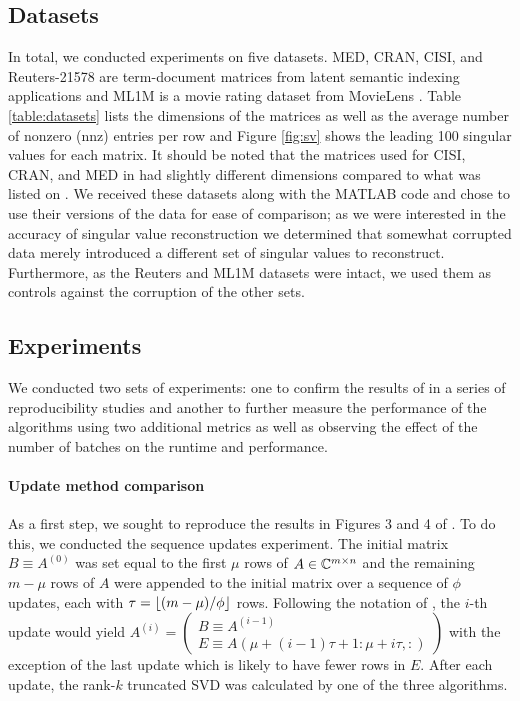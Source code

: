 \subsection{Datasets}

In total, we conducted experiments on five datasets. MED, CRAN, CISI, and Reuters-21578 are term-document matrices from latent semantic indexing applications \cite{LSISite,Cai2005,Cai2007,Cai2008,Cai2009} and ML1M is a movie rating dataset from MovieLens \cite{Harper2015}.
Table \ref{table:datasets} lists the dimensions of the matrices as well as the average number of nonzero (nnz) entries per row and Figure \ref{fig:sv} shows the leading 100 singular values for each matrix.
It should be noted that the matrices used for CISI, CRAN, and MED in \cite{Kalantzis2021} had slightly different dimensions compared to what was listed on \cite{LSISite}.
We received these datasets along with the MATLAB code and chose to use their versions of the data for ease of comparison; as we were interested in the accuracy of singular value reconstruction we determined that somewhat corrupted data merely introduced a different set of singular values to reconstruct.
Furthermore, as the Reuters and ML1M datasets were intact, we used them as controls against the corruption of the other sets.



\subsection{Experiments}

We conducted two sets of experiments: one to confirm the results of \cite{Kalantzis2021} in a series of reproducibility studies and another to further measure the performance of the algorithms using two additional metrics as well as observing the effect of the number of batches on the runtime and performance.

\paragraph{Update method comparison} 

As a first step, we sought to reproduce the results in Figures 3 and 4 of \cite{Kalantzis2021}.
To do this, we conducted the sequence updates experiment.
The initial matrix $B\equiv A^{(0)}$ was set equal to the first $\mu$ rows of $A\in\mathbb{C}^{m\times n}$ and the remaining $m-\mu$ rows of $A$ were appended to the initial matrix over a sequence of $\phi$ updates, each with $\tau=\lfloor (m-\mu)/\phi \rfloor$ rows.
Following the notation of \cite{Kalantzis2021}, the $i$-th update would yield $A^{(i)} = \begin{pmatrix} B\equiv A^{(i-1)} \\ E\equiv A(\mu+(i-1)\tau+1:\mu+i\tau,:) \end{pmatrix}$ with the exception of the last update which is likely to have fewer rows in $E$.
After each update, the rank-$k$ truncated SVD was calculated by one of the three algorithms.

